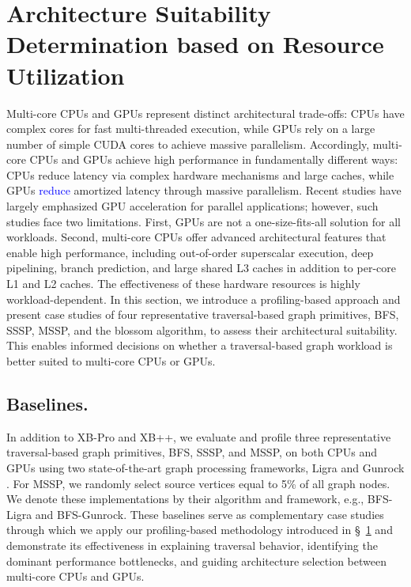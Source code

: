 \section{Architecture Suitability Determination based on Resource Utilization}
\label{sec:arch_suitability}
Multi-core CPUs and GPUs represent distinct architectural trade-offs: CPUs have complex cores for fast multi-threaded execution, while GPUs rely on a large number of simple CUDA cores to achieve massive parallelism.
Accordingly, multi-core CPUs and GPUs achieve high performance in fundamentally different ways: CPUs reduce latency via complex hardware mechanisms and large caches, while GPUs \textcolor{blue}{reduce} amortized latency through massive parallelism.
Recent studies have largely emphasized GPU acceleration for parallel applications; however, such studies face two limitations.
First, GPUs are not a one-size-fits-all solution for all workloads.
Second, multi-core CPUs offer advanced architectural features that enable high performance, including out-of-order superscalar execution, deep pipelining, branch prediction, and large shared L3 caches in addition to per-core L1 and L2 caches.
The effectiveness of these hardware resources is highly workload-dependent.
In this section, we introduce a profiling-based approach and present case studies of four representative traversal-based graph primitives, BFS, SSSP, MSSP, and the blossom algorithm, to assess their architectural suitability. 
This enables informed decisions on whether a traversal-based graph workload is better suited to multi-core CPUs or GPUs.

\subsection{Baselines.}
\label{subsec:baselines}
In addition to XB-Pro and XB++, we evaluate and profile three representative traversal-based graph primitives, BFS, SSSP, and MSSP, on both CPUs and GPUs using two state-of-the-art graph processing frameworks, Ligra \cite{shun2013ligra} and Gunrock \cite{wang2016gunrock}.
For MSSP, we randomly select source vertices equal to 5\% of all graph nodes.
We denote these implementations by their algorithm and framework, e.g., BFS-Ligra and BFS-Gunrock.
These baselines serve as complementary case studies through which we apply our profiling-based methodology introduced in \S~\ref{sec:arch_suitability} and demonstrate its effectiveness in explaining traversal behavior, identifying the dominant performance bottlenecks, and guiding architecture selection between multi-core CPUs and GPUs.

